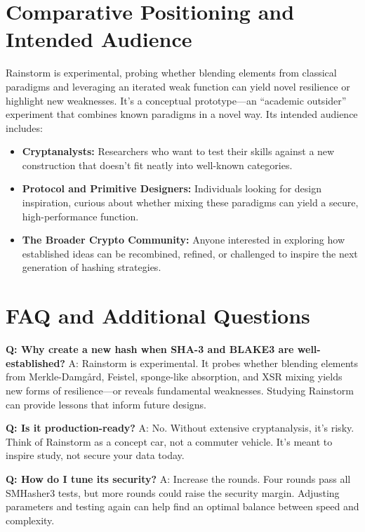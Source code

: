\documentclass[11pt,a4paper]{article}
\begin{document}
\section*{Comparative Positioning and Intended Audience}
Rainstorm is experimental, probing whether blending elements from classical paradigms and leveraging an iterated weak function can yield novel resilience or highlight new weaknesses. It’s a conceptual prototype—an “academic outsider” experiment that combines known paradigms in a novel way. Its intended audience includes:

\begin{itemize}
  \item \textbf{Cryptanalysts:} Researchers who want to test their skills against a new construction that doesn’t fit neatly into well-known categories.
  
  \item \textbf{Protocol and Primitive Designers:} Individuals looking for design inspiration, curious about whether mixing these paradigms can yield a secure, high-performance function.
  
  \item \textbf{The Broader Crypto Community:} Anyone interested in exploring how established ideas can be recombined, refined, or challenged to inspire the next generation of hashing strategies.
\end{itemize}

\section*{FAQ and Additional Questions}

\textbf{Q: Why create a new hash when SHA-3 and BLAKE3 are well-established?}  
A: Rainstorm is experimental. It probes whether blending elements from Merkle-Damg{\aa}rd, Feistel, sponge-like absorption, and XSR mixing yields new forms of resilience—or reveals fundamental weaknesses. Studying Rainstorm can provide lessons that inform future designs.

\textbf{Q: Is it production-ready?}  
A: No. Without extensive cryptanalysis, it’s risky. Think of Rainstorm as a concept car, not a commuter vehicle. It’s meant to inspire study, not secure your data today.

\textbf{Q: How do I tune its security?}  
A: Increase the rounds. Four rounds pass all SMHasher3 tests, but more rounds could raise the security margin. Adjusting parameters and testing again can help find an optimal balance between speed and complexity.
\end{document}
